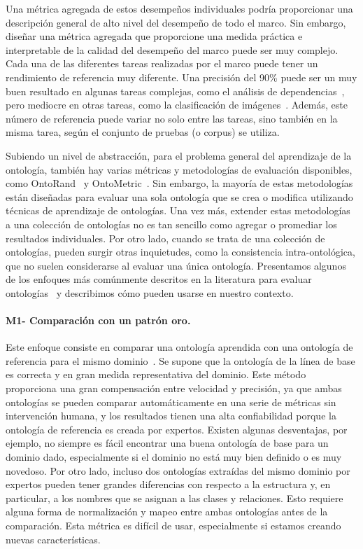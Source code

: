 Una métrica agregada de estos desempeños individuales podría proporcionar una descripción general de alto nivel del desempeño de todo el marco.
Sin embargo, diseñar una métrica agregada que proporcione una medida práctica e interpretable de la calidad del desempeño del marco puede ser muy complejo.
Cada una de las diferentes tareas realizadas por el marco puede tener un rendimiento de referencia muy diferente.
Una precisión del 90\% puede ser un muy buen resultado en algunas tareas complejas, como el análisis de dependencias~\cite{AlbertiABCGKKMO17}, pero mediocre en otras tareas, como la clasificación de imágenes~\cite{Russakovsky2015}.
Además, este número de referencia puede variar no solo entre las tareas, sino también en la misma tarea, según el conjunto de pruebas (o corpus)
se utiliza.

Subiendo un nivel de abstracción, para el problema general del aprendizaje de la ontología, también hay varias métricas y metodologías de evaluación disponibles, como OntoRand~\cite{ontorand} y OntoMetric~\cite{ontometric}.
Sin embargo, la mayoría de estas metodologías están diseñadas para evaluar una sola ontología que se crea o modifica utilizando técnicas de aprendizaje de ontologías.
Una vez más, extender estas metodologías a una colección de ontologías no es tan sencillo como agregar o promediar los resultados individuales.
Por otro lado, cuando se trata de una colección de ontologías, pueden surgir otras inquietudes, como la consistencia intra-ontológica, que no suelen considerarse al evaluar una única ontología.
Presentamos algunos de los enfoques más comúnmente descritos en la literatura para evaluar ontologías~\cite{petasis2011ontology} y describimos cómo pueden usarse en nuestro contexto.

\paragraph{M1- Comparación con un patrón oro.}

Este enfoque consiste en comparar una ontología aprendida con una ontología de referencia para el mismo dominio~\cite{corcoglioniti2016frame}.
Se supone que la ontología de la línea de base es correcta y en gran medida representativa del dominio.
Este método proporciona una gran compensación entre velocidad y precisión, ya que ambas ontologías se pueden comparar automáticamente en una serie de métricas sin intervención humana, y los resultados tienen una alta confiabilidad porque la ontología de referencia es creada por expertos.
Existen algunas desventajas, por ejemplo, no siempre es fácil encontrar una buena ontología de base para un dominio dado, especialmente si el dominio no está muy bien definido o es muy novedoso.
Por otro lado, incluso dos ontologías extraídas del mismo dominio por expertos pueden tener grandes diferencias con respecto a la estructura y, en particular, a los nombres que se asignan a las clases y relaciones.
Esto requiere alguna forma de normalización y mapeo entre ambas ontologías antes de la comparación.
Esta métrica es difícil de usar, especialmente si estamos creando nuevas características.

